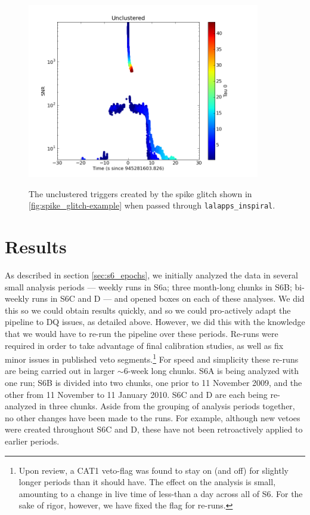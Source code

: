 \begin{figure}[hp]
\center
\includegraphics[width=4in]{figures/spike_glitch/L1_945281603.png}
\label{fig:spike_glitch-cbc_response}
\caption{The unclustered triggers created by the spike glitch shown in
\ref{fig:spike_glitch-example} when passed through \texttt{lalapps\_inspiral}.}
\end{figure}

\section{Results}

As described in section \ref{sec:s6_epochs}, we initially analyzed the data in
several small analysis periods --- weekly runs in S6a; three month-long chunks
in S6B; bi-weekly runs in S6C and D --- and opened boxes on each of these
analyses. We did this so we could obtain results quickly, and so we could
pro-actively adapt the pipeline to \ac{DQ} issues, as detailed above. However,
we did this with the knowledge that we would have to re-run the pipeline over
these periods. Re-runs were required in order to take advantage of final
calibration studies, as well as fix minor issues in published veto
segments.\footnote{Upon review, a CAT1 veto-flag was found to stay on (and off)
for slightly longer periods than it should have. The effect on the analysis is
small, amounting to a change in live time of less-than a day across all of S6.
For the sake of rigor, however, we have fixed the flag for re-runs.} For speed
and simplicity these re-runs are being carried out in larger $\sim6$-week long
chunks.  S6A is being analyzed with one run; S6B is divided into two chunks,
one prior to 11 November 2009, and the other from 11 November to 11 January
2010. S6C and D are each being re-analyzed in three chunks. Aside from the
grouping of analysis periods together, no other changes have been made to the
runs. For example, although new vetoes were created throughout S6C and D, these
have not been retroactively applied to earlier periods.

